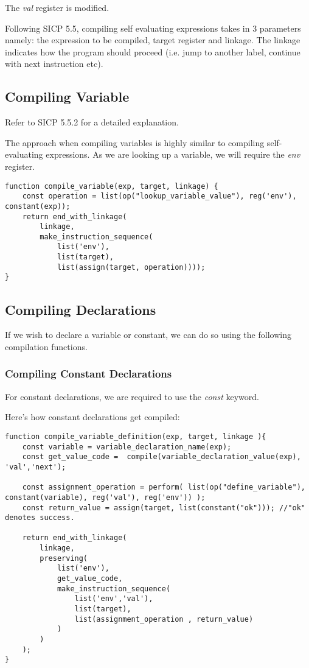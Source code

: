 The \textit{val} register is modified.

Following SICP 5.5, compiling self evaluating expressions takes in 3 parameters namely: the expression to be compiled, target register and linkage. The linkage indicates how the program should proceed (i.e. jump to another label, continue with next instruction etc).

\subsection{Compiling Variable}
Refer to SICP 5.5.2 for a detailed explanation.

The approach when compiling variables is highly similar to compiling self-evaluating expressions.
As we are looking up a variable, we will require the \textit{env} register.

\begin{lstlisting}[caption=Compile variable]
function compile_variable(exp, target, linkage) {
    const operation = list(op("lookup_variable_value"), reg('env'), constant(exp));
    return end_with_linkage(
        linkage,
        make_instruction_sequence(
            list('env'),
            list(target),
            list(assign(target, operation))));
}
\end{lstlisting}

\subsection{Compiling Declarations}
If we wish to declare a variable or constant, we can do so using the following compilation functions.

\subsubsection{Compiling Constant Declarations}
For constant declarations, we are required to use the \textit{const} keyword.

Here's how constant declarations get compiled:
\begin{lstlisting}[caption=Compile constant declarations]
function compile_variable_definition(exp, target, linkage ){
    const variable = variable_declaration_name(exp);
    const get_value_code =  compile(variable_declaration_value(exp), 'val','next');

    const assignment_operation = perform( list(op("define_variable"), constant(variable), reg('val'), reg('env')) );
    const return_value = assign(target, list(constant("ok"))); //"ok" denotes success.
    
    return end_with_linkage(
        linkage,
        preserving(
            list('env'),
            get_value_code,
            make_instruction_sequence(
                list('env','val'),
                list(target),
                list(assignment_operation , return_value)
            )
        )
    );
}
\end{lstlisting}

